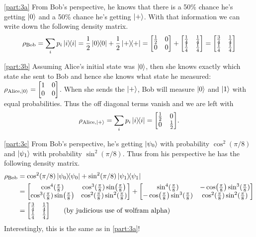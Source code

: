 \documentclass[boxes,pages]{homework}
\begin{document}
\begin{solution}
	\ref{part:3a}
	From Bob's perspective, he knows that there is a 50\% chance he's getting $\ket{0}$ and a 50\% chance he's getting $\ket{+}$. With that information we can write down the following density matrix.
	\begin{equation*}
		\rho_\text{Bob} = \sum_ip_i\ketbra{i}{i} =\frac{1}{2}\ketbra{0}{0} + \frac{1}{2}\ketbra{+}{+} = \mqty[\frac{1}{2} & 0 \\ 0 & 0] + \mqty[\frac{1}{4} & \frac{1}{4} \\ \frac{1}{4} & \frac{1}{4}] = \mqty[\frac{3}{4} & \frac{1}{4} \\ \frac{1}{4} & \frac{1}{4}]
	\end{equation*}

	\ref{part:3b}
	Assuming Alice's initial state was $\ket{0}$, then she knows exactly which state she sent to Bob and hence she knows what state he measured: $\rho_{\text{Alice},\ket{0}} = \mqty[1 & 0 \\ 0 & 0]$. When she sends the $\ket{+}$, Bob will measure $\ket{0}$ and $\ket{1}$ with equal probabilities. Thus the off diagonal terms vanish and we are left with
	\begin{equation*}
		\rho_{\text{Alice},\ket{+}} = \sum_i p_i\ketbra{i}{i} = \mqty[\frac{1}{2} & 0 \\ 0 & \frac{1}{2}].
	\end{equation*}

	\ref{part:3c}
	From Bob's perspective, he's getting $\ket{\psi_0}$ with probability $\cos^2(\pi/8)$ and $\ket{\psi_1}$ with probability $\sin^2(\pi/8)$. Thus from his perspective he has the following density matrix.
	\begin{align*}
		\rho_\text{Bob} & = \cos^2(\pi/8)\ketbra{\psi_0}{\psi_0} + \sin^2(\pi/8)\ketbra{\psi_1}{\psi_1} \\
		& = \mqty[\cos^4(\tfrac{\pi}{8}) & \cos^3(\tfrac{\pi}{8})\sin(\tfrac{\pi}{8}) \\ \cos^3(\tfrac{\pi}{8})\sin(\tfrac{\pi}{8}) & \cos^2(\tfrac{\pi}{8})\sin^2(\tfrac{\pi}{8})] + \mqty[\sin^4(\tfrac{\pi}{8}) & -\cos(\tfrac{\pi}{8})\sin^3(\tfrac{\pi}{8}) \\ -\cos(\tfrac{\pi}{8})\sin^3(\tfrac{\pi}{8}) & \cos^2(\tfrac{\pi}{8})\sin^2(\tfrac{\pi}{8})] \\
		& = \mqty[\frac{3}{4} & \frac{1}{4} \\ \frac{1}{4} & \frac{1}{4}] \tag{by judicious use of wolfram alpha}
	\end{align*}
	Interestingly, this is the same as in \ref{part:3a}!


\end{solution}
\end{document}
